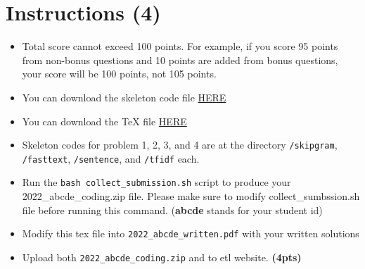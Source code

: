 \documentclass{assignment format}
\begin{document}
\begin{center}
\end{center}
\def\showanswers{1}

\section{Instructions (4)}
\begin{itemize}
\item Total score cannot exceed 100 points. For example, if you score 95 points from non-bonus questions and 10 points are added from bonus questions, your score will be 100 points, not 105 points.
\item You can download the skeleton code file \href{https://raw.githubusercontent.com/yc-song/gsds-nlp-assignment-1/main/a1.zip}{HERE} 
\item You can download the TeX file \href{https://raw.githubusercontent.com/yc-song/gsds-nlp-assignment-1/main/a1(tex).zip}{HERE} 
\item Skeleton codes for problem 1, 2, 3, and 4 are at the directory \texttt{/skipgram}, \texttt{/fasttext}, \texttt{/sentence}, and \texttt{/tfidf} each. 
\item Run the \texttt{bash collect\_submission.sh} script to produce your 2022\_abcde\_coding.zip file. Please make sure to modify collect\_sumbssion.sh file before running this command. (\textbf{abcde} stands for your student id)
\item Modify this tex file into \texttt{2022\_abcde\_written.pdf} with your written solutions
\item Upload both \texttt{2022\_abcde\_coding.zip} and to etl website. \textbf{(4pts)}
\end{itemize}



\end{document}
